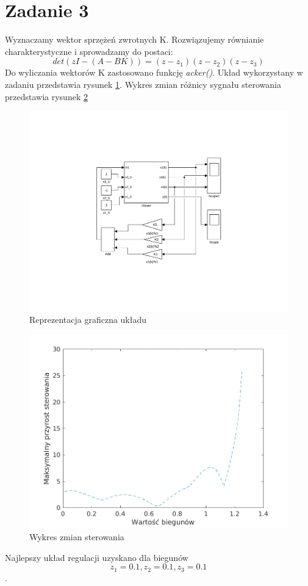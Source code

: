 \documentclass{article}
\begin{document}
\section{Zadanie 3}
Wyznaczamy wektor sprzężeń zwrotnych K. Rozwiązujemy równianie charakterystyczne i sprowadzamy do postaci:
\[det(zI -(A-BK)) = (z-z_1)(z-z_2)(z-z_3)\]
Do wyliczania wektorów K zastosowano funkcję \textit{acker()}.
Układ wykorzystany w zadaniu przedstawia rysunek \ref{fig:graficzny}. Wykres zmian różnicy sygnału sterowania przedstawia rysunek \ref{fig:wykres}
\begin{figure}
\centering
\includegraphics[width=0.7\linewidth]{zad3/graficzny}
\caption{Reprezentacja graficzna układu}
\label{fig:graficzny}
\end{figure}
\begin{figure}
\centering
\includegraphics[width=0.7\linewidth]{zad3/wykres_zad3}
\caption{Wykres zmian sterowania}
\label{fig:wykres}
\end{figure}
Najlepszy układ regulacji uzyskano dla biegunów \[z_1=0.1, z_2=0.1, z_3=0.1\]. 
\end{document}
